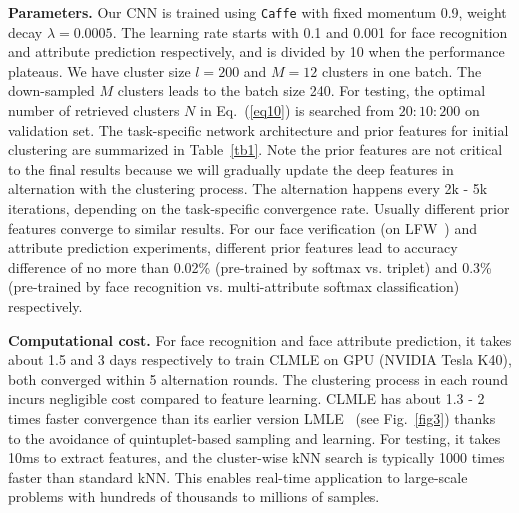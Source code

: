 \documentclass[10pt,journal,compsoc]{IEEEtran}
\begin{document}
\noindent
{\bf Parameters.} Our CNN is trained using \texttt{Caffe} with fixed momentum 0.9, weight decay $\lambda=0.0005$. The learning rate starts with 0.1 and 0.001 for face recognition and attribute prediction respectively, and is divided by 10 when the performance plateaus. We have cluster size $l=200$ and $M=12$ clusters in one batch. The down-sampled $M$ clusters leads to the batch size 240. For testing, the optimal number of retrieved clusters $N$ in Eq.~(\ref{eq10}) is searched from $20:10:200$ on validation set. The task-specific network architecture and prior features for initial clustering are summarized in Table~\ref{tb1}. Note the prior features are not critical to the final results because we will gradually update the deep features in alternation with the clustering process. The alternation happens every 2k - 5k iterations, depending on the task-specific convergence rate. Usually different prior features converge to similar results. For our face verification (on LFW~\cite{LFWTech}) and attribute prediction experiments, different prior features lead to accuracy difference of no more than 0.02\% (pre-trained by softmax vs. triplet) and 0.3\% (pre-trained by face recognition vs. multi-attribute softmax classification) respectively.

\noindent
{\bf Computational cost.} For face recognition and face attribute prediction, it takes about 1.5 and 3 days respectively to train CLMLE on GPU (NVIDIA Tesla K40), both converged within 5 alternation rounds. The clustering process in each round incurs negligible cost compared to feature learning. CLMLE has about 1.3 - 2 times faster convergence than its earlier version LMLE~\cite{huang2016lmle} (see Fig.~\ref{fig3}) thanks to the avoidance of quintuplet-based sampling and learning. For testing, it takes 10ms to extract features, and the cluster-wise kNN search is typically 1000 times faster than standard kNN. This enables real-time application to large-scale problems with hundreds of thousands to millions of samples.

\begin{table}[t]
\caption{The CNN architecture and prior features for initial clustering in our considered imbalanced tasks.}
\centering
{}
\label{tb1}
\end{table}
\end{document}

